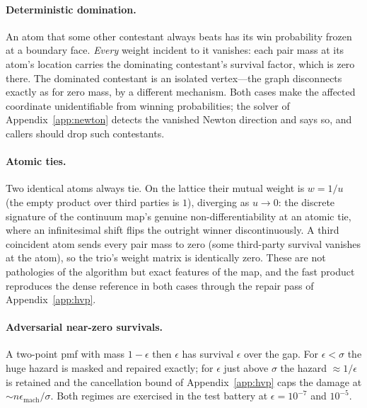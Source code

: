 \documentclass[11pt]{article}
\theoremstyle{definition}
\theoremstyle{remark}
\begin{document}
\paragraph{Deterministic domination.}
An atom that some other contestant always beats has its win probability
frozen at a boundary face.  \emph{Every} weight incident to it vanishes:
each pair mass at its atom's location carries the dominating contestant's
survival factor, which is zero there.  The dominated contestant is an
isolated vertex---the graph disconnects exactly as for zero mass, by a
different mechanism.  Both cases make the affected coordinate
unidentifiable from winning probabilities; the solver of
Appendix~\ref{app:newton} detects the vanished Newton direction and says
so, and callers should drop such contestants.

\paragraph{Atomic ties.}
Two identical atoms always tie.  On the lattice their mutual weight is
$w = 1/u$ (the empty product over third parties is $1$), diverging as
$u \to 0$: the discrete signature of the continuum map's genuine
non-differentiability at an atomic tie, where an infinitesimal shift flips
the outright winner discontinuously.  A third coincident atom sends every
pair mass to zero (some third-party survival vanishes at the atom), so the
trio's weight matrix is identically zero.  These are not pathologies of the
algorithm but exact features of the map, and the fast product reproduces
the dense reference in both cases through the repair pass of
Appendix~\ref{app:hvp}.

\paragraph{Adversarial near-zero survivals.}
A two-point pmf with mass $1 - \epsilon$ then $\epsilon$ has survival
$\epsilon$ over the gap.  For $\epsilon < \sigma$ the huge hazard is masked
and repaired exactly; for $\epsilon$ just above $\sigma$ the hazard
$\approx 1/\epsilon$ is retained and the cancellation bound of
Appendix~\ref{app:hvp} caps the damage at
$\sim n\epsilon_{\mathrm{mach}}/\sigma$.  Both regimes are exercised in the
test battery at $\epsilon = 10^{-7}$ and $10^{-5}$.
\end{document}
